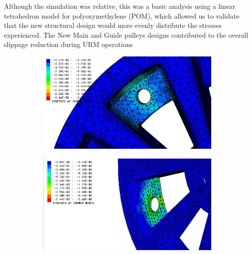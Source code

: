 \documentclass[paper=a4, fontsize=11pt]{scrartcl}
\numberwithin{equation}{section}		%
\numberwithin{figure}{section}			%
\numberwithin{table}{section}				%
\begin{document}
Although the simulation was relative, this was a basic analysis using a linear tetrahedron model for polyoxymethylene (POM), which allowed us to validate that the new structural design would more evenly distribute the stresses experienced. The New Main and Guide pulleys designs contributed to the overall slippage reduction during URM operations
\begin{figure}[H]
        \centering
        \begin{subfigure}[h]{0.8\textwidth}
                \includegraphics[height=5cm]{good502}
                \caption{}
				\label{fema}
        \end{subfigure}%
       \quad
        \begin{subfigure}[h]{0.8\textwidth}
                \includegraphics[height=5cm]{goodorig502}
                \caption{}
                \label{femb}
        \end{subfigure}
        

\end{figure}
\end{document}
